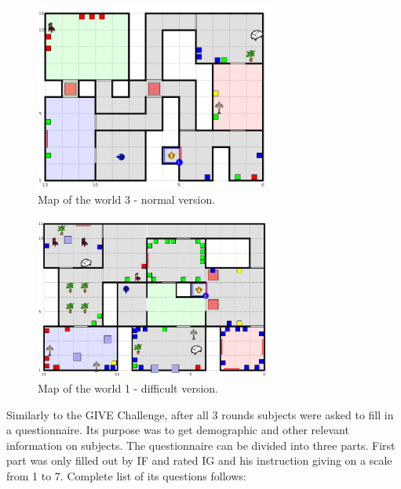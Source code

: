 \begin{figure}[!htbp]
  \centering
	\includegraphics[width=0.7\textwidth]{Images/dataset-world3}
	\caption{Map of the world 3 - normal version.}
	\label{fig:dataset-world3}
\end{figure}

\begin{figure}[!htbp]
  \centering
	\includegraphics[width=0.7\textwidth]{Images/dataset-world1d}
	\caption{Map of the world 1 - difficult version.}
	\label{fig:dataset-world1d}
\end{figure}

Similarly to the GIVE Challenge, after all 3 rounds subjects were asked to fill in a questionnaire. Its purpose was to get demographic and other relevant information on subjects. The questionnaire can be divided into three parts. First part was only filled out by IF and rated IG and his instruction giving on a scale from 1 to 7. Complete list of its questions follows: 

